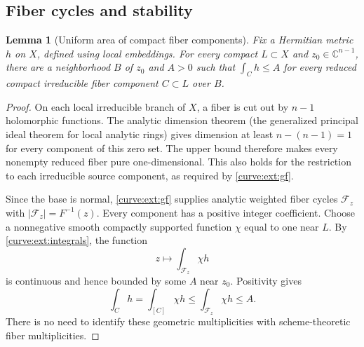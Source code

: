 \documentclass[11pt]{amsart}
\newtheorem{lemma}[theorem]{Lemma}
\theoremstyle{definition}
\theoremstyle{remark}
\numberwithin{equation}{section}
\newcommand{\C}{\mathbb C}
\begin{document}
\subsection{Fiber cycles and stability}
\begin{lemma}[Uniform area of compact fiber components]\label{curve:lem:area}
Fix a Hermitian metric \(h\) on \(X\), defined using local embeddings.
For every compact \(L\subset X\) and \(z_0\in\C^{n-1}\), there are a
neighborhood \(B\) of \(z_0\) and \(A>0\) such that \(\int_C h\leq A\)
for every reduced compact irreducible fiber component \(C\subset L\)
over \(B\).
\end{lemma}
\begin{proof}
On each local irreducible branch of \(X\), a fiber is cut out by
\(n-1\) holomorphic functions. The analytic dimension theorem
(the generalized principal ideal theorem for local analytic rings)
gives dimension at least \(n-(n-1)=1\) for every component of this
zero set. The upper bound therefore makes every nonempty reduced
fiber pure one-dimensional. This also holds for the restriction to
each irreducible source component, as required by \ref{curve:ext:gf}.

Since the base is normal, \ref{curve:ext:gf} supplies analytic weighted
fiber cycles \(\mathcal F_z\) with
\(|\mathcal F_z|=F^{-1}(z)\). Every component has a positive
integer coefficient.
Choose a nonnegative smooth compactly supported function \(\chi\)
equal to one near \(L\).
By \ref{curve:ext:integrals}, the function
\[
 z\longmapsto\int_{\mathcal F_z}\chi h
\]
is continuous and hence bounded by some \(A\) near \(z_0\).
Positivity gives
\[
 \int_C h=\int_{[C]}\chi h
 \leq\int_{\mathcal F_z}\chi h\leq A.
\]
There is no need to identify these geometric multiplicities with
scheme-theoretic fiber multiplicities.
\end{proof}
\end{document}

